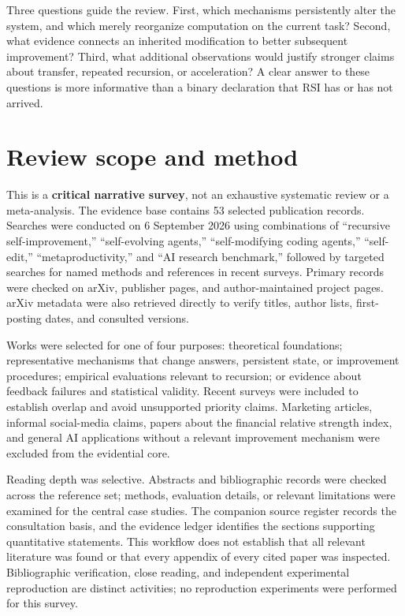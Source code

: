 \documentclass[11pt,american,]{article}
\begin{document}
Three questions guide the review. First, which mechanisms persistently
alter the system, and which merely reorganize computation on the current
task? Second, what evidence connects an inherited modification to better
subsequent improvement? Third, what additional observations would
justify stronger claims about transfer, repeated recursion, or
acceleration? A clear answer to these questions is more informative than
a binary declaration that RSI has or has not arrived.

\hypertarget{review-scope-and-method}{%
\section{Review scope and method}\label{review-scope-and-method}}

This is a \textbf{critical narrative survey}, not an exhaustive
systematic review or a meta-analysis. The evidence base contains 53
selected publication records. Searches were conducted on 6 September
2026 using combinations of ``recursive self-improvement,''
``self-evolving agents,'' ``self-modifying coding agents,''
``self-edit,'' ``metaproductivity,'' and ``AI research benchmark,''
followed by targeted searches for named methods and references in recent
surveys. Primary records were checked on arXiv, publisher pages, and
author-maintained project pages. arXiv metadata were also retrieved
directly to verify titles, author lists, first-posting dates, and
consulted versions.

Works were selected for one of four purposes: theoretical foundations;
representative mechanisms that change answers, persistent state, or
improvement procedures; empirical evaluations relevant to recursion; or
evidence about feedback failures and statistical validity. Recent
surveys were included to establish overlap and avoid unsupported
priority claims. Marketing articles, informal social-media claims,
papers about the financial relative strength index, and general AI
applications without a relevant improvement mechanism were excluded from
the evidential core.

Reading depth was selective. Abstracts and bibliographic records were
checked across the reference set; methods, evaluation details, or
relevant limitations were examined for the central case studies. The
companion source register records the consultation basis, and the
evidence ledger identifies the sections supporting quantitative
statements. This workflow does not establish that all relevant
literature was found or that every appendix of every cited paper was
inspected. Bibliographic verification, close reading, and independent
experimental reproduction are distinct activities; no reproduction
experiments were performed for this survey.
\end{document}
